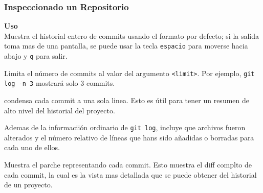 \documentclass[8pt]{beamer}
\begin{document}
\begin{frame}
\frametitle{Inspeccionado un Repositorio}
\textbf{Uso}\\

Muestra el historial entero de commits usando el formato por defecto; si la salida toma mas de una pantalla, se puede usar la tecla \texttt{espacio} para moverse hacia abajo y \texttt{q} para salir.

Limita el n\'umero de commits al valor del argumento \texttt{<limit>}. Por ejemplo, \texttt{git log -n 3} mostrar\'a solo 3 commits.

condensa cada commit a una sola linea. Esto es \'util para tener un resumen de alto nivel del historial del proyecto.

Ademas de la informacii\'on ordinario de \texttt{git log}, incluye que archivos fueron alterados y el n\'umero relativo de l\'ineas que hans sido a\~nadidas o borradas para cada uno de ellos.

Muestra el parche representando cada commit. Esto muestra el diff complto de cada commit, la cual es la vista mas detallada que se puede obtener del historial de un proyecto.
\end{frame}
\end{document}
